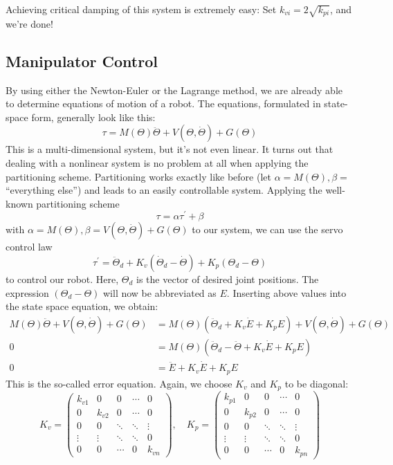 Achieving critical damping of this system is extremely easy: Set $k_{v i}=2 \sqrt{k_{p i}}$, and we're done!

\subsection{Manipulator Control}

By using either the Newton-Euler or the Lagrange method, we are already able to determine equations of motion of a robot. The equations, formulated in state-space form, generally look like this:
$$
\tau=M(\Theta) \ddot{\Theta}+V(\Theta, \dot{\Theta})+G(\Theta)
$$
This is a multi-dimensional system, but it's not even linear. It turns out that dealing with a nonlinear system is no problem at all when applying the partitioning scheme. Partitioning works exactly like before (let $\alpha=M(\Theta), \beta=$``everything else'') and leads to an easily controllable system. Applying the well-known partitioning scheme
$$
\tau=\alpha \tau^{\prime}+\beta
$$
with $\alpha=M(\Theta), \beta=V(\Theta, \dot{\Theta})+G(\Theta)$ to our system, we can use the servo control law
$$
\tau^{\prime}=\ddot{\Theta}_{d}+K_{v}\left(\dot{\Theta}_{d}-\dot{\Theta}\right)+K_{p}\left(\Theta_{d}-\Theta\right)
$$
to control our robot. Here, $\Theta_{d}$ is the vector of desired joint positions. The expression $\left(\Theta_{d}-\Theta\right)$ will now be abbreviated as $E$. Inserting above values into the state space equation, we obtain:
$$
\begin{aligned}
M(\Theta) \ddot{\Theta}+V(\Theta, \dot{\Theta})+G(\Theta) &=M(\Theta)\left(\ddot{\Theta}_{d}+K_{v} \dot{E}+K_{p} E\right)+V(\Theta, \dot{\Theta})+G(\Theta) \\
0 &=M(\Theta)\left(\ddot{\Theta}_{d}-\ddot{\Theta}+K_{v} \dot{E}+K_{p} E\right) \\
0 &=\ddot{E}+K_{v} \dot{E}+K_{p} E
\end{aligned}
$$
This is the so-called error equation. Again, we choose $K_{v}$ and $K_{p}$ to be diagonal:
$$
K_{v}=\left(\begin{array}{ccccc}
k_{v 1} & 0 & 0 & \cdots & 0 \\
0 & k_{v 2} & 0 & \cdots & 0 \\
0 & 0 & \ddots & \ddots & \vdots \\
\vdots & \vdots & \ddots & \ddots & 0 \\
0 & 0 & \cdots & 0 & k_{v n}
\end{array}\right), \quad K_{p}=\left(\begin{array}{ccccc}
k_{p 1} & 0 & 0 & \cdots & 0 \\
0 & k_{p 2} & 0 & \cdots & 0 \\
0 & 0 & \ddots & \ddots & \vdots \\
\vdots & \vdots & \ddots & \ddots & 0 \\
0 & 0 & \cdots & 0 & k_{p n}
\end{array}\right)
$$

